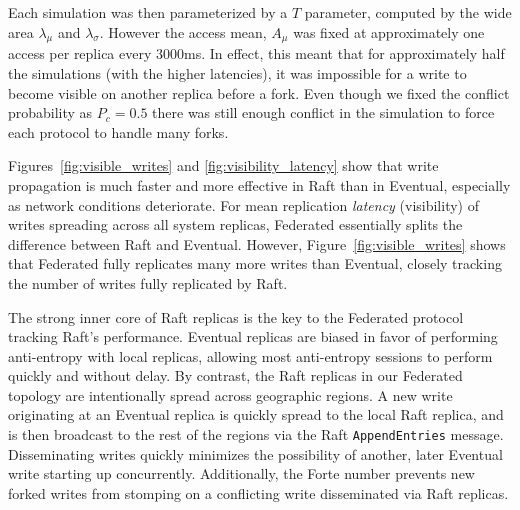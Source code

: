 \documentclass[10pt,conference,letterpaper]{IEEEtran}
\newcommand{\todo}[1]{{\textcolor{red}{#1}}}
\newcommand{\pjk}[1]{[\todo{PJK: #1}]}
\begin{document}
Each simulation was then parameterized by a $T$ parameter, computed by the
wide area $\lambda_{\mu}$ and $\lambda_{\sigma}$.
However the access mean, $A_{\mu}$ was fixed at approximately one access per replica every
3000ms.
In effect, this meant that for approximately half the simulations (with the higher
latencies), it was impossible for a write to become visible on another replica before a
fork.
Even though we fixed the conflict probability as $P_c=0.5$ there was still enough conflict
in the simulation to force each protocol to handle many forks.


Figures~\ref{fig:visible_writes} and \ref{fig:visibility_latency} show that
write propagation is much faster and more effective in Raft than in Eventual,
especially as network conditions deteriorate.
For mean replication \emph{latency} (visibility) of writes spreading across
all system replicas, Federated essentially splits the difference between Raft
and Eventual.
However, Figure~\ref{fig:visible_writes} shows that Federated fully replicates
many more writes than Eventual, closely tracking the number of writes fully
replicated by Raft.

The strong inner core of Raft replicas is the key to the Federated protocol
tracking Raft's performance.
Eventual replicas are biased in favor of performing anti-entropy with local
replicas, allowing most anti-entropy sessions to perform quickly and without
delay.
By contrast, the Raft replicas in our Federated topology are intentionally
spread across geographic regions.
A new write originating at an Eventual replica is quickly spread to the local
Raft replica, and is then broadcast to the rest of the regions via the Raft
\texttt{AppendEntries} message.
Disseminating writes quickly minimizes the possibility of another, later
Eventual write starting up concurrently.
Additionally, the Forte number prevents new forked writes from stomping on a
conflicting write disseminated via Raft replicas.
\end{document}
